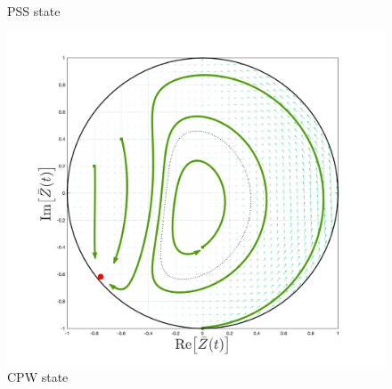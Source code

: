 \begin{figure}[H]
  \caption{PSS state}\label{fig:MFRPSS}
\endminipage\hfill
{}%
  \includegraphics[width=\linewidth, trim={2cm 1cm 2cm 1.5cm },clip]{../Figures/MFOARCPW_random.png}
  \caption{CPW state}\label{fig:MFRCPW}
\endminipage
\end{figure}

